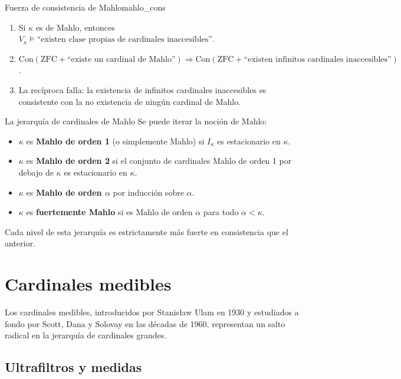 \begin{teorema}{Fuerza de consistencia de Mahlo}{mahlo_cons}
\begin{enumerate}[leftmargin=2em, label=(\roman*)]
  \item Si $\kappa$ es de Mahlo, entonces $V_\kappa \models \text{``existen clase propias de cardinales inaccesibles''}$.
  \item $\mathrm{Con}(\mathrm{ZFC} + \text{``existe un cardinal de Mahlo''}) \Rightarrow \mathrm{Con}(\mathrm{ZFC} + \text{``existen infinitos cardinales inaccesibles''})$.
  \item La recíproca falla: la existencia de infinitos cardinales inaccesibles es consistente con la no existencia de ningún cardinal de Mahlo.
\end{enumerate}
\end{teorema}

\begin{ejemplo}{La jerarquía de cardinales de Mahlo}{}
Se puede iterar la noción de Mahlo:
\begin{itemize}[leftmargin=2em]
  \item $\kappa$ es \textbf{Mahlo de orden 1} (o simplemente Mahlo) si $I_\kappa$ es estacionario en $\kappa$.
  \item $\kappa$ es \textbf{Mahlo de orden 2} si el conjunto de cardinales Mahlo de orden 1 por debajo de $\kappa$ es estacionario en $\kappa$.
  \item $\kappa$ es \textbf{Mahlo de orden $\alpha$} por inducción sobre $\alpha$.
  \item $\kappa$ es \textbf{fuertemente Mahlo} si es Mahlo de orden $\alpha$ para todo $\alpha < \kappa$.
\end{itemize}
Cada nivel de esta jerarquía es estrictamente más fuerte en consistencia que el anterior.
\end{ejemplo}

\section{Cardinales medibles}

Los cardinales medibles, introducidos por Stanisław Ulam en 1930 y estudiados a fondo por Scott, Dana y Solovay en las décadas de 1960, representan un salto radical en la jerarquía de cardinales grandes.

\subsection{Ultrafiltros y medidas}

